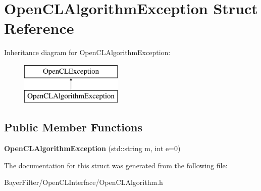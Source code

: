 \hypertarget{struct_open_c_l_algorithm_exception}{\section{Open\-C\-L\-Algorithm\-Exception Struct Reference}
\label{struct_open_c_l_algorithm_exception}
}
Inheritance diagram for Open\-C\-L\-Algorithm\-Exception\-:\begin{figure}[H]
\begin{center}
\leavevmode
\includegraphics[height=2.000000cm]{struct_open_c_l_algorithm_exception}
\end{center}
\end{figure}
\subsection*{Public Member Functions}
\begin{DoxyCompactItemize}
\item 
\hypertarget{struct_open_c_l_algorithm_exception_a191ac23feee8f4521276c3e17be765de}{{\bfseries Open\-C\-L\-Algorithm\-Exception} (std\-::string m, int e=0)}\label{struct_open_c_l_algorithm_exception_a191ac23feee8f4521276c3e17be765de}

\end{DoxyCompactItemize}


The documentation for this struct was generated from the following file\-:\begin{DoxyCompactItemize}
\item 
Bayer\-Filter/\-Open\-C\-L\-Interface/Open\-C\-L\-Algorithm.\-h\end{DoxyCompactItemize}
